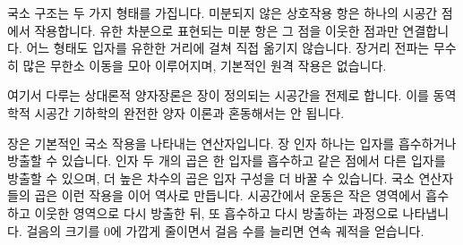 \begin{classroomqa}
\end{classroomqa}

국소 구조는 두 가지 형태를 가집니다. 미분되지 않은 상호작용 항은 하나의 시공간 점에서 작용합니다. 유한 차분으로 표현되는 미분 항은 그 점을 이웃한 점과만 연결합니다. 어느 형태도 입자를 유한한 거리에 걸쳐 직접 옮기지 않습니다. 장거리 전파는 무수히 많은 무한소 이동을 모아 이루어지며, 기본적인 원격 작용은 없습니다.

\begin{classroomqa}
\end{classroomqa}

\begin{classroomqa}
\end{classroomqa}

여기서 다루는 상대론적 양자장론은 장이 정의되는 시공간을 전제로 합니다. 이를 동역학적 시공간 기하학의 완전한 양자 이론과 혼동해서는 안 됩니다.

\begin{classroomqa}
\end{classroomqa}

장은 기본적인 국소 작용을 나타내는 연산자입니다. 장 인자 하나는 입자를 흡수하거나 방출할 수 있습니다. 인자 두 개의 곱은 한 입자를 흡수하고 같은 점에서 다른 입자를 방출할 수 있으며, 더 높은 차수의 곱은 입자 구성을 더 바꿀 수 있습니다. 국소 연산자들의 곱은 이런 작용을 이어 역사로 만듭니다. 시공간에서 운동은 작은 영역에서 흡수하고 이웃한 영역으로 다시 방출한 뒤, 또 흡수하고 다시 방출하는 과정으로 나타냅니다. 걸음의 크기를 0에 가깝게 줄이면서 걸음 수를 늘리면 연속 궤적을 얻습니다.

